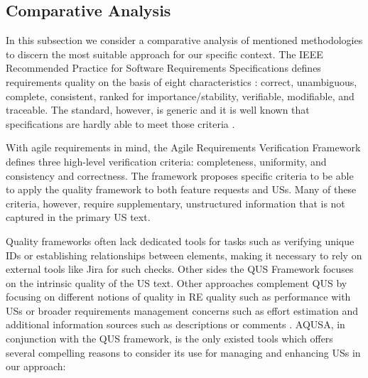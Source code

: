 \subsection{Comparative Analysis} \label{usq_5}
In this subsection we consider a comparative analysis of mentioned methodologies to discern the most suitable approach for our specific context.
The IEEE Recommended Practice for Software Requirements Speciﬁcations deﬁnes requirements quality on the basis of eight characteristics \cite{doe2011recommended}: correct, unambiguous, complete, consistent, ranked for importance/stability, veriﬁable, modiﬁable, and traceable. The standard, however, is generic and it is well known that speciﬁcations are hardly able to meet those criteria \cite{glinz2000improving}. 

With agile requirements in mind, the Agile Requirements Veriﬁcation Framework \cite{heck2014quality} deﬁnes three high-level veriﬁcation criteria: completeness, uniformity, and consistency and correctness. The framework proposes speciﬁc criteria to be able to apply the quality framework to both feature requests and USs. Many of these criteria, however, require supplementary, unstructured information that is not captured in the primary US text. 

Quality frameworks often lack dedicated tools for tasks such as verifying unique IDs or establishing relationships between elements, making it necessary to rely on external tools like Jira for such checks.
Other sides the QUS Framework focuses on the intrinsic quality of the US text. Other approaches complement QUS by focusing on different notions of quality in RE quality such as performance with USs \cite{lombriser2016gamified} or broader requirements management concerns such as effort estimation and additional information sources such as descriptions or comments \cite{heck2014quality}. 
AQUSA, in conjunction with the QUS framework, is the only existed tools which offers several compelling reasons to consider its use for managing and enhancing USs in our approach: 

